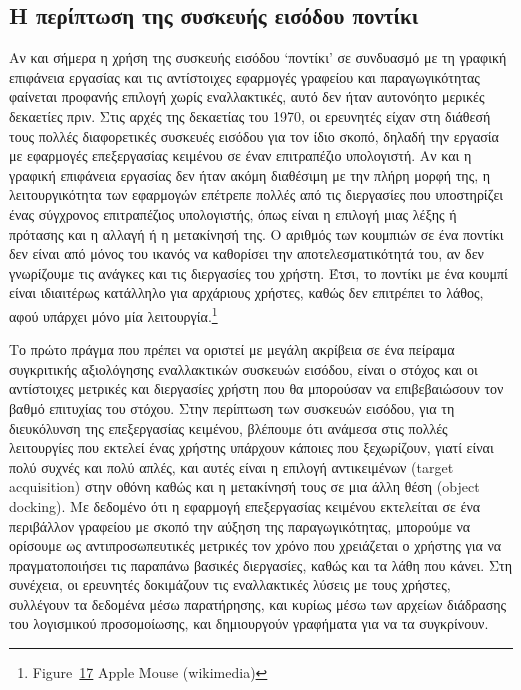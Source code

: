 \documentclass[
]{article}
\begin{document}
\hypertarget{ux3b7-ux3c0ux3b5ux3c1ux3afux3c0ux3c4ux3c9ux3c3ux3b7-ux3c4ux3b7ux3c2-ux3c3ux3c5ux3c3ux3baux3b5ux3c5ux3aeux3c2-ux3b5ux3b9ux3c3ux3ccux3b4ux3bfux3c5-ux3c0ux3bfux3bdux3c4ux3afux3baux3b9}{%
\subsection{Η περίπτωση της συσκευής εισόδου
ποντίκι}\label{ux3b7-ux3c0ux3b5ux3c1ux3afux3c0ux3c4ux3c9ux3c3ux3b7-ux3c4ux3b7ux3c2-ux3c3ux3c5ux3c3ux3baux3b5ux3c5ux3aeux3c2-ux3b5ux3b9ux3c3ux3ccux3b4ux3bfux3c5-ux3c0ux3bfux3bdux3c4ux3afux3baux3b9}}

Αν και σήμερα η χρήση της συσκευής εισόδου `ποντίκι' σε συνδυασμό με τη
γραφική επιφάνεια εργασίας και τις αντίστοιχες εφαρμογές γραφείου και
παραγωγικότητας φαίνεται προφανής επιλογή χωρίς εναλλακτικές, αυτό δεν
ήταν αυτονόητο μερικές δεκαετίες πριν. Στις αρχές της δεκαετίας του
1970, οι ερευνητές είχαν στη διάθεσή τους πολλές διαφορετικές συσκευές
εισόδου για τον ίδιο σκοπό, δηλαδή την εργασία με εφαρμογές επεξεργασίας
κειμένου σε έναν επιτραπέζιο υπολογιστή. Αν και η γραφική επιφάνεια
εργασίας δεν ήταν ακόμη διαθέσιμη με την πλήρη μορφή της, η
λειτουργικότητα των εφαρμογών επέτρεπε πολλές από τις διεργασίες που
υποστηρίζει ένας σύγχρονος επιτραπέζιος υπολογιστής, όπως είναι η
επιλογή μιας λέξης ή πρότασης και η αλλαγή ή η μετακίνησή της. Ο αριθμός
των κουμπιών σε ένα ποντίκι δεν είναι από μόνος του ικανός να καθορίσει
την αποτελεσματικότητά του, αν δεν γνωρίζουμε τις ανάγκες και τις
διεργασίες του χρήστη. Έτσι, το ποντίκι με ένα κουμπί είναι ιδιαιτέρως
κατάλληλο για αρχάριους χρήστες, καθώς δεν επιτρέπει το λάθος, αφού
υπάρχει μόνο μία λειτουργία.\footnote{Figure~\protect\hyperlink{fig:apple-mouse}{17}
  Apple Mouse (wikimedia)}

Το πρώτο πράγμα που πρέπει να οριστεί με μεγάλη ακρίβεια σε ένα πείραμα
συγκριτικής αξιολόγησης εναλλακτικών συσκευών εισόδου, είναι ο στόχος
και οι αντίστοιχες μετρικές και διεργασίες χρήστη που θα μπορούσαν να
επιβεβαιώσουν τον βαθμό επιτυχίας του στόχου. Στην περίπτωση των
συσκευών εισόδου, για τη διευκόλυνση της επεξεργασίας κειμένου, βλέπουμε
ότι ανάμεσα στις πολλές λειτουργίες που εκτελεί ένας χρήστης υπάρχουν
κάποιες που ξεχωρίζουν, γιατί είναι πολύ συχνές και πολύ απλές, και
αυτές είναι η επιλογή αντικειμένων (target acquisition) στην οθόνη καθώς
και η μετακίνησή τους σε μια άλλη θέση (object docking). Με δεδομένο ότι
η εφαρμογή επεξεργασίας κειμένου εκτελείται σε ένα περιβάλλον γραφείου
με σκοπό την αύξηση της παραγωγικότητας, μπορούμε να ορίσουμε ως
αντιπροσωπευτικές μετρικές τον χρόνο που χρειάζεται ο χρήστης για να
πραγματοποιήσει τις παραπάνω βασικές διεργασίες, καθώς και τα λάθη που
κάνει. Στη συνέχεια, οι ερευνητές δοκιμάζουν τις εναλλακτικές λύσεις με
τους χρήστες, συλλέγουν τα δεδομένα μέσω παρατήρησης, και κυρίως μέσω
των αρχείων διάδρασης του λογισμικού προσομοίωσης, και δημιουργούν
γραφήματα για να τα συγκρίνουν.
\end{document}
